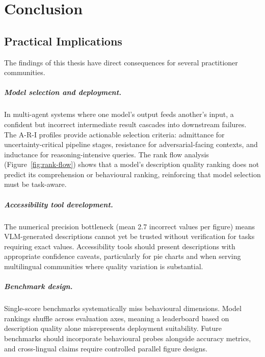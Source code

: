 \chapter{Conclusion}\label{ch:conclusion}

\section{Practical Implications}\label{sec:implications}

The findings of this thesis have direct consequences for several practitioner communities.

\paragraph{Model selection and deployment.}
In multi-agent systems where one model's output feeds another's input, a confident but incorrect intermediate result cascades into downstream failures.
The A-R-I profiles provide actionable selection criteria: admittance for uncertainty-critical pipeline stages, resistance for adversarial-facing contexts, and inductance for reasoning-intensive queries.
The rank flow analysis (Figure~\ref{fig:rank-flow}) shows that a model's description quality ranking does not predict its comprehension or behavioural ranking, reinforcing that model selection must be task-aware.

\paragraph{Accessibility tool development.}
The numerical precision bottleneck (mean 2.7 incorrect values per figure) means VLM-generated descriptions cannot yet be trusted without verification for tasks requiring exact values.
Accessibility tools should present descriptions with appropriate confidence caveats, particularly for pie charts and when serving multilingual communities where quality variation is substantial.

\paragraph{Benchmark design.}
Single-score benchmarks systematically miss behavioural dimensions.
Model rankings shuffle across evaluation axes, meaning a leaderboard based on description quality alone misrepresents deployment suitability.
Future benchmarks should incorporate behavioural probes alongside accuracy metrics, and cross-lingual claims require controlled parallel figure designs.


